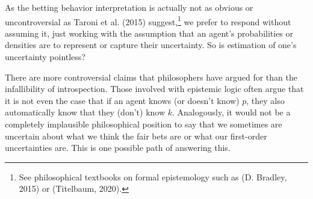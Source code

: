 \documentclass[
  10pt,
  dvipsnames,enabledeprecatedfontcommands]{scrartcl}
\begin{document}
As the betting behavior interpretation is actually not as obvious or
uncontroversial as Taroni et al. (2015) suggest,\footnote{See
  philosophical textbooks on formal epistemology such as (D. Bradley,
  2015) or (Titelbaum, 2020).} we prefer to respond without assuming it,
just working with the assumption that an agent's probabilities or
densities are to represent or capture their uncertainty. So is
estimation of one's uncertainty pointless?

There are more controversial claims that philosophers have argued for
than the infallibility of introspection. Those involved with epistemic
logic often argue that it is not even the case that if an agent knows
(or doesn't know) \(p\), they also automatically know that they (don't)
know \(k\). Analogously, it would not be a completely implausible
philosophical position to say that we sometimes are uncertain about what
we think the fair bets are or what our first-order uncertainties are.
This is one possible path of answering this.
\end{document}
